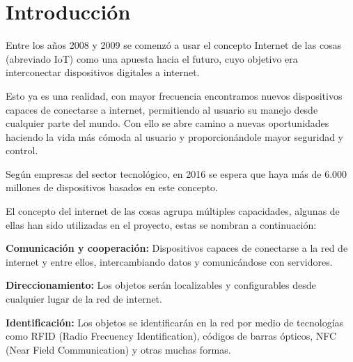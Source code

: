 
\cleardoublepage


\chapter{Introducción}
\label{makereference}

Entre los años 2008 y 2009 se comenzó a usar el concepto Internet de las cosas (abreviado IoT) como una apuesta hacia el futuro, cuyo objetivo era interconectar dispositivos digitales a internet.

Esto ya es una realidad, con mayor frecuencia encontramos nuevos dispositivos capaces de conectarse a internet, permitiendo al usuario su manejo desde cualquier parte del mundo. Con ello se abre camino a nuevas oportunidades haciendo la vida más cómoda al usuario y proporcionándole mayor seguridad y control.

Según empresas del sector tecnológico, en 2016 se espera que haya más de 6.000 millones de dispositivos basados en este concepto.

El concepto del internet de las cosas agrupa múltiples capacidades, algunas de ellas han sido utilizadas en el proyecto, estas se nombran a continuación:

\textbf{Comunicación y cooperación:} Dispositivos capaces de conectarse a la red de internet y entre ellos, intercambiando datos y comunicándose con servidores.

\textbf{Direccionamiento:} Los objetos serán localizables y configurables desde cualquier lugar de la red de internet.

\textbf{Identificación:} Los objetos se identificarán en la red por medio de tecnologías como RFID (Radio Frecuency Identification), códigos de barras ópticos, NFC (Near Field Communication) y otras muchas formas.

